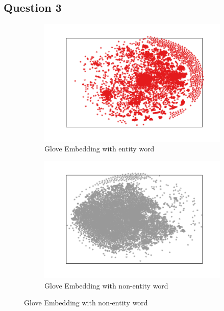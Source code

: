 \documentclass{article}
\begin{document}
\subsection{Question 3}

\begin{figure}[t]
	\centering
	\begin{subfigure}{0.5\textwidth}
		\includegraphics[width=\linewidth]{glove_embedding_positive.pdf}
		\caption{Glove Embedding with entity word}
		\label{fig:glove_positive}
	\end{subfigure}\hfil 
	\begin{subfigure}{0.5\textwidth}
		\includegraphics[width=\linewidth]{glove_embedding_negative.pdf}
		\caption{Glove Embedding with non-entity word}
		\label{fig:glove_negative}
	\end{subfigure}
\end{figure}
\end{document}
